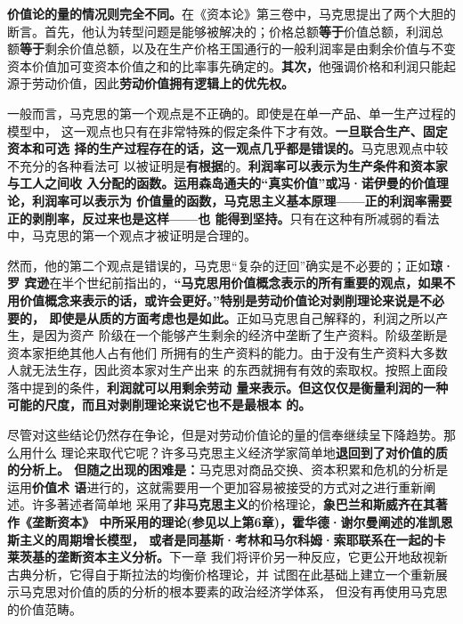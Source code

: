 \textbf{价值论的量的情况则完全不同。}在《资本论》第三卷中，马克思提出了两个大胆的
断言。首先，他认为转型问题是能够被解决的；价格总额\textbf{等于}价值总额，利润总
额\textbf{等于}剩余价值总额，以及在生产价格王国通行的一般利润率是由剩余价值与不变
资本价值加可变资本价值之和的比率事先确定的。\textbf{其次，}他强调价格和利润只能起
源于劳动价值，因此\textbf{劳动价值拥有逻辑上的优先权。}

一般而言，马克思的第一个观点是不正确的。即使是在单一产品、单一生产过程的模型中，
这一观点也只有在非常特殊的假定条件下才有效。\textbf{一旦联合生产、固定资本和可选
  择的生产过程存在的话，这一观点几乎都是错误的。}马克思观点中较不充分的各种看法可
以被证明是\textbf{有根据}的。\textbf{利润率可以表示为生产条件和资本家与工人之间收
  入分配的函数。运用森岛通夫的“真实价值”或冯·诺伊曼的价值理论，利润率可以表示为
  价值量的函数，马克思主义基本原理——正的利润率需要正的剥削率，反过来也是这样——也
  能得到坚持。}只有在这种有所减弱的看法中，马克思的第一个观点才被证明是合理的。

然而，他的第二个观点是错误的，马克思“复杂的迂回”确实是不必要的；正如\textbf{琼·罗
  宾逊}在半个世纪前指出的，\textbf{“马克思用价值概念表示的所有重要的观点，如果不
  用价值概念来表示的话，或许会更好。”特别是劳动价值论对剥削理论来说是不必要的，
  即使是从质的方面考虑也是如此。}正如马克思自己解释的，利润之所以产生，是因为资产
阶级在一个能够产生剩余的经济中垄断了生产资料。阶级垄断是资本家拒绝其他人占有他们
所拥有的生产资料的能力。由于没有生产资料大多数人就无法生存，因此资本家对生产出来
的东西就拥有有效的索取权。按照上面段落中提到的条件，\textbf{利润就可以用剩余劳动
  量来表示。但这仅仅是衡量利润的一种可能的尺度，而且对剥削理论来说它也不是最根本
  的。}

尽管对这些结论仍然存在争论，但是对劳动价值论的量的信奉继续呈下降趋势。那么用什么
理论来取代它呢？许多马克思主义经济学家简单地\textbf{退回到了对价值的质的分析上。
  但随之出现的困难是：}马克思对商品交换、资本积累和危机的分析是运用\textbf{价值术
  语}进行的，这就需要用一个更加容易被接受的方式对之进行重新阐述。许多著述者简单地
采用了\textbf{非马克思主义}的价格理论，\textbf{象巴兰和斯威齐在其著作《垄断资本》
  中所采用的理论(参见以上第6章)，霍华德·谢尔曼阐述的准凯恩斯主义的周期增长模型，
  或者是同基斯·考林和马尔科姆·索耶联系在一起的卡莱茨基的垄断资本主义分析。}下一章
我们将评价另一种反应，它更公开地敌视新古典分析，它得自于斯拉法的均衡价格理论，并
试图在此基础上建立一个重新展示马克思对价值的质的分析的根本要素的政治经济学体系，
但没有再使用马克思的价值范畴。

